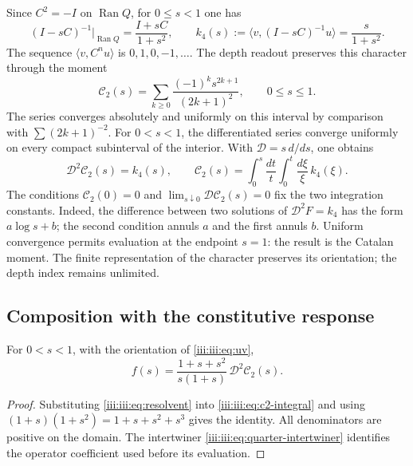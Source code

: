 Since $C^2=-I$ on $\operatorname{Ran}Q$, for $0\leq s<1$ one has
\begin{equation}
 (I-sC)^{-1}\big|_{\operatorname{Ran}Q}=\frac{I+sC}{1+s^2},
 \qquad k_4(s):=\langle v,(I-sC)^{-1}u\rangle=\frac{s}{1+s^2}.
 \label{iii:iii:eq:resolvent}
\end{equation}
The sequence $\langle v,C^nu\rangle$ is $0,1,0,-1,\ldots$. The depth
readout preserves this character through the moment
\begin{equation}
 \mathcal C_2(s)=\sum_{k\geq0}\frac{(-1)^ks^{2k+1}}{(2k+1)^2},
 \qquad 0\leq s\leq1.
 \label{iii:iii:eq:c2}
\end{equation}
The series converges absolutely and uniformly on this interval by
comparison with $\sum(2k+1)^{-2}$. For $0<s<1$, the differentiated series
converge uniformly on every compact subinterval of the interior. With
$\mathcal D=s\,d/ds$, one obtains
\begin{equation}
 \mathcal D^2\mathcal C_2(s)=k_4(s),\qquad
 \mathcal C_2(s)=\int_0^s\frac{dt}{t}\int_0^t\frac{d\xi}{\xi}\,k_4(\xi).
 \label{iii:iii:eq:c2-integral}
\end{equation}
The conditions $\mathcal C_2(0)=0$ and
$\lim_{s\downarrow0}\mathcal D\mathcal C_2(s)=0$ fix the two integration
constants. Indeed, the difference between two solutions of
$\mathcal D^2F=k_4$ has the form $a\log s+b$; the second condition
annuls $a$ and the first annuls $b$.
Uniform convergence permits evaluation at the endpoint $s=1$: the result is
the Catalan moment. The finite representation of the character preserves its
orientation; the depth index remains unlimited.

\subsection{Composition with the constitutive response}

\begin{theorem}
For $0<s<1$, with the orientation of \eqref{iii:iii:eq:uv},
\begin{equation}
 f(s)=\frac{1+s+s^2}{s(1+s)}\,\mathcal D^2\mathcal C_2(s).
 \label{iii:iii:eq:catalan-vacuum}
\end{equation}
\end{theorem}
\begin{proof}
Substituting \eqref{iii:iii:eq:resolvent} into \eqref{iii:iii:eq:c2-integral} and using
$(1+s)(1+s^2)=1+s+s^2+s^3$ gives the identity. All denominators are
positive on the domain. The intertwiner \eqref{iii:iii:eq:quarter-intertwiner}
identifies the operator coefficient used before its evaluation.
\end{proof}

